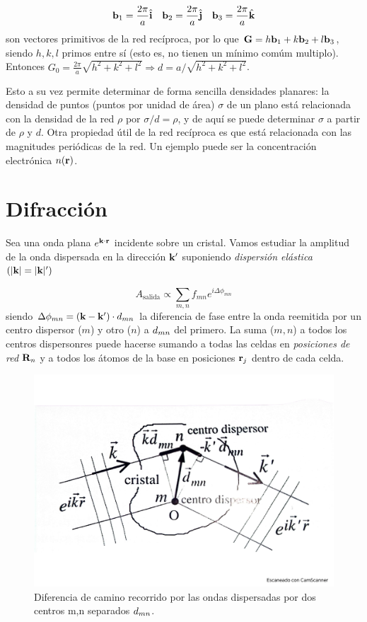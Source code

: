 \begin{equation*}
    \mathbf{b}_1 = \frac{2\pi}{a} \hat{\mathbf{i}} \quad \mathbf{b}_2 = \frac{2\pi}{a} \hat{\mathbf{j}} \quad \mathbf{b}_3 = \frac{2\pi}{a} \hat{\mathbf{k}}
\end{equation*}
son vectores primitivos de la red recíproca, por lo que $\mathbf{G}=h\mathbf{b}_1+k\mathbf{b}_2+l\mathbf{b}_3$, siendo $h,k,l$ primos entre sí (esto es, no tienen un mínimo comúm multiplo). Entonces $G_0=\frac{2\pi}{a} \sqrt{h^2 + k^2 + l^2} \Rightarrow d = a/ \sqrt{h^2 + k^2 + l^2}$. 

Esto a su vez permite determinar de forma sencilla densidades planares: la densidad de puntos (puntos por unidad de área) $\sigma$ de un plano está relacionada con la densidad de la red $\rho$ por $\sigma/d = \rho$, y de aquí se puede determinar $\sigma$ a partir de $\rho$ y $d$. Otra propiedad útil de la red recíproca es que está relacionada con las magnitudes periódicas de la red. Un ejemplo puede ser la concentración electrónica $n(\mathbf{r})$.

\section{Difracción}

Sea una onda plana $e^{\mathbf{k} \cdot \mathbf{r}}$ incidente sobre un cristal. Vamos estudiar la amplitud de la onda dispersada en la dirección $\mathbf{k}'$ suponiendo \textit{dispersión elástica} $(|\mathbf{k}|=|\mathbf{k}|')$

\begin{equation}
    A_{\text{salida}} \propto \sum_{m,n} f_{mn} e^{i \Delta \phi_{mn}}
\end{equation}
siendo $\Delta \phi_{mn} = (\mathbf{k} - \mathbf{k}') \cdot \mathbf{}d_{mn}$ la diferencia de fase entre la onda reemitida por un centro dispersor ($m$) y otro ($n$) a $\mathbf{}d_{mn}$ del primero. La suma ($m,n$) a todos los centros dispersonres puede hacerse sumando a todas las celdas en \textit{posiciones de red} $\mathbf{R}_n$ y a todos los átomos de la base en posiciones $\mathbf{r}_j$ dentro de cada celda. 

\begin{figure}[h!] \centering
    \includegraphics[scale=0.35]{Cuerpo/Ch_02/Fotos_libro 2.pdf}
    \caption{Diferencia de camino recorrido por las ondas dispersadas por dos centros m,n separados $\mathbf{}d_{mn}$.}
    \label{Fig:02-02}
\end{figure}

